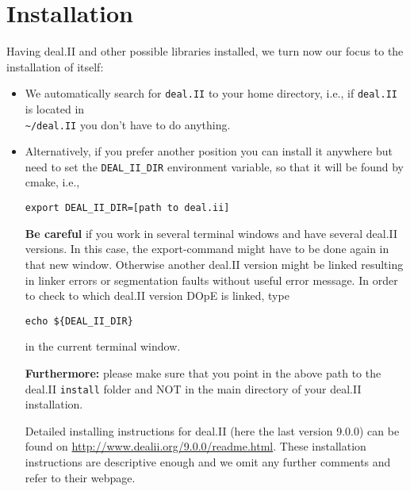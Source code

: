 \section{Installation}\label{sec_installation}
Having deal.II and other possible libraries installed, we turn now our focus 
to the installation of \dope{} itself:
\begin{itemize}
\item We automatically search for \texttt{deal.II} to your home
  directory, i.e., if \texttt{deal.II} is located in \\
\texttt{\textasciitilde/deal.II} you don't have to do anything. 
\item Alternatively, if you prefer another position you can install it anywhere but need 
to set the \texttt{DEAL\_II\_DIR} environment variable, so that it 
will be found by cmake, i.e.,
\begin{lstlisting}
export DEAL_II_DIR=[path to deal.ii]
\end{lstlisting}
\begin{remark}
\textbf{Be careful} if you work in several terminal windows and have several deal.II versions. In this case, the
export-command might have to be done again in that new window. Otherwise
another deal.II version might be linked resulting in linker errors or
segmentation faults without useful error message. In order to check to which
deal.II version DOpE is linked, type 
\begin{lstlisting}
echo ${DEAL_II_DIR}
\end{lstlisting}
in the current terminal window.
\end{remark}
\begin{remark}
\textbf{Furthermore:} please make sure that you point in the above path 
to the deal.II \texttt{install} folder and NOT in the main directory of your deal.II 
installation.
\end{remark}

Detailed installing instructions for deal.II (here the last version
9.0.0) can be found on 
\url{http://www.dealii.org/9.0.0/readme.html}. These
installation instructions are descriptive enough and we omit 
any further comments and refer to their webpage.
%


\end{itemize}
